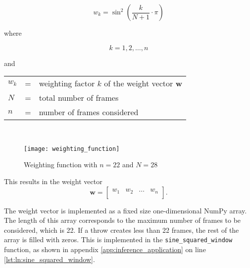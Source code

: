 \begin{equation}
  w_k = \sin^2\left(\frac{k}{N+1} \cdot \pi \right)
  \label{eq:weighting_function}
\end{equation}

where

\[
  k = 1, 2, \dots, n
\]

and

\begin{tabular}{lll}
  $w_k$ & = & weighting factor $k$ of the weight vector $\boldsymbol{w}$ \\
  $N$ & = & total number of frames \\
  $n$ & = & number of frames considered \\
\end{tabular}
\\

\begin{figure}
  \centering
  \texttt{[image: weighting\_function]}
  \caption{Weighting function with $n = 22$ and $N = 28$}
  \label{fig:weighting_function}
\end{figure}

This results in the weight vector
\begin{equation}
  \boldsymbol{w} =
  \begin{bmatrix}
    w_{1} & w_{2} & \dots & w_{n} \\
  \end{bmatrix}.
  \label{eq:weight_vector}
\end{equation}

The weight vector is implemented as a fixed size one-dimensional NumPy array. %
The length of this array corresponds to the maximum number of frames to be considered, which is \num{22}.
If a throw creates less than \num{22} frames, the rest of the array is filled with zeros.
This is implemented in the \texttt{sine\_squared\_window} function, as shown in appendix \ref{app:inference_application} on line \ref{lst:ln:sine_squared_window}.


